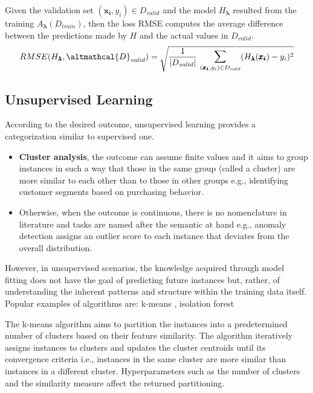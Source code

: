 \begin{example}\label{ex:rmse}
    Given the validation set $(\pmb{x_i}, y_i) \in D_\mathit{valid}$  and the model $H_{\pmb{\lambda}}$ resulted from the training $A_{\pmb{\lambda}}(D_\mathit{train})$, then the loss RMSE computes the average difference between the predictions made by $H$ and the actual values in $D_\mathit{valid}$.
    \begin{equation*}
        RMSE(H_{\pmb{\lambda}}, \altmathcal{D}_\mathit{valid}) = \sqrt{\frac{1}{|D_\mathit{valid}|}~\mathlarger{\sum}_{(\pmb{x_i}, y_i) \in D_\mathit{valid}} (H_{\pmb{\lambda}}(\pmb{x_i}) - y_i)^2}
    \end{equation*}
\end{example}

\subsection{Unsupervised Learning}

According to the desired outcome, unsupervised learning provides a categorization similar to supervised one.
\begin{itemize}
    \item \textbf{Cluster analysis}, the outcome can assume finite values and it aims to group instances in such a way that those in the same group (called a cluster) are more similar to each other than to those in other groups e.g., identifying customer segments based on purchasing behavior.
    \item Otherwise, when the outcome is continuous, there is no nomenclature in literature and tasks are named after the semantic at hand e.g., anomaly detection assigns an outlier score to each instance that deviates from the overall distribution.
\end{itemize}
However, in unsupervised scenarios, the knowledge acquired through model fitting does not have the goal of predicting future instances but, rather, of understanding the inherent patterns and structure within the training data itself.
Popular examples of algorithms are: k-means \cite{k_means}, isolation forest \cite{random_forest}

\begin{example}
    The k-means algorithm aims to partition the instances into a predetermined number of clusters based on their feature similarity.
    The algorithm iteratively assigns instances to clusters and updates the cluster centroids until its convergence criteria i.e., instances in the same cluster are more similar than instances in a different cluster.
    Hyperparameters such as the number of clusters and the similarity measure affect the returned partitioning.
\end{example}

